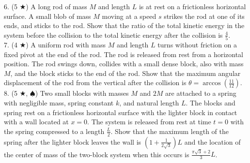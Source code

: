 6. (5 $\bigstar$) A long rod of mass $M$ and length $L$ is at rest on a frictionless horizontal surface. A small blob of mass $M$ moving at a speed $s$ strikes the rod at one of its ends, and sticks to the rod. Show that the ratio of the total kinetic energy in the system before the collision to the total kinetic energy after the collision is $\frac{4}{5}$. \\
7. (4 $\bigstar$) A uniform rod with mass $M$ and length $L$ turns without friction on a fixed pivot at the end of the rod. The rod is released from rest from a horizontal position. The rod swings down, collides with a small dense block, also with mass $M$, and the block sticks to the end of the rod. Show that the maximum angular displacement of the rod from the vertical after the collision is $\theta = \arccos\left(\frac{11}{12}\right)$.\\
8. (5 $\bigstar$, $\spadesuit$) Two small blocks with masses $M$ and $2M$ are attached to a spring with negligible mass, spring constant $k$, and natural length $L$. The blocks and spring rest on a frictionless horizontal surface with the lighter block in contact with a wall located at $x=0$. The system is released from rest at time $t=0$ with the spring compressed to a length $\frac{L}{2}$. Show that the maximum length of the spring after the lighter block leaves the wall is $\left(1 + \frac{1}{2\sqrt{3}}\right) L$ and the location of the center of mass of the two-block system when this occurs is $\frac{\pi\sqrt{3}+2}{3}L$.
\pagebreak